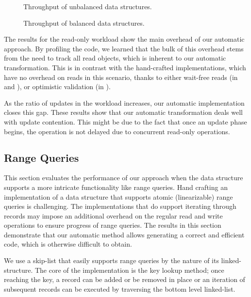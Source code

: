 \begin{figure*}
\begin{center}

\end{center}
\caption{Throughput of unbalanced data structures.}
\label{evaluation:results:unbalanced}
\end{figure*}


\begin{figure*}
\begin{center}

\end{center}
\caption{Throughput of balanced data
structures.}
\label{evaluation:results:balanced}
\end{figure*}

The results for the read-only workload show the main overhead
of our automatic approach. By profiling the code, we learned 
that the bulk of this overhead stems from the need to track all read objects,
which is inherent to our automatic transformation. 
This is in contrast with the hand-crafted implementations,
which have no overhead on reads in this scenario, thanks to either 
wait-free reads (in \danaTree and \danaAVL), or optimistic validation (in \bronson). 
 
As the ratio of updates in the workload increases, our automatic implementation 
closes this gap.
These results show that our automatic transformation deals well with update contention. 
This might be due to the fact that once
an update phase begins, the operation is not delayed due to concurrent 
read-only operations. 


\subsection{Range Queries}
\label{sec:range} 

This section evaluates the performance of our approach when the data
structure supports a more intricate functionality like range queries. Hand
crafting an implementation of a data structure that supports atomic
(linearizable) range queries is challenging.
The implementations that do support iterating through records may impose an
additional overhead on the regular read and write operations to ensure
progress of range queries.
The results in this section demonstrate that our automatic method
allows generating a correct and efficient code, which is otherwise difficult
to obtain.

We use a skip-list that easily supports range queries by the
nature of its linked-structure. The core of the implementation is the key lookup
method; once reaching the key, a record can be added or be removed in place or
an iteration of subsequent records can be executed by traversing
the bottom level linked-list.

